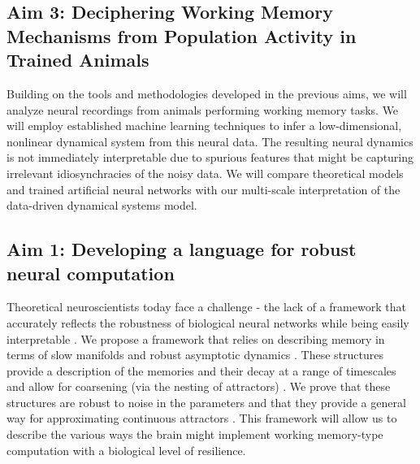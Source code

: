 \documentclass[12pt,letterpaper, onecolumn]{article}
\theoremstyle{definition}
\theoremstyle{remark}
\begin{document}
\subsection*{Aim 3: Deciphering Working Memory Mechanisms from Population Activity in Trained Animals}
Building on the tools and methodologies developed in the previous aims, we will analyze neural recordings from animals performing working memory tasks.
We will employ established machine learning techniques to infer a low-dimensional, nonlinear dynamical system from this neural data.
The resulting neural dynamics is not immediately interpretable due to spurious features that might be capturing irrelevant idiosynchracies of the noisy data.
We will compare theoretical models and trained artificial neural networks with our multi-scale interpretation of the data-driven dynamical systems model.

\newpage

\subsection*{Aim 1: Developing a language for robust neural computation}
Theoretical neuroscientists today face a challenge - the lack of a  framework that accurately reflects the robustness of biological neural networks while being easily interpretable \citep{lillicrap2019}.
We propose a framework that relies on describing memory in terms of slow manifolds \citep{ghazizadeh2021slow} and robust asymptotic dynamics \citep{casey1996}.
These structures provide a description of the memories and their decay at a range of timescales \citep{jaeger2023timescales} and allow for coarsening (via the nesting of attractors) \citep{braun2010}.
We prove that these structures are robust to noise in the parameters \citep{Park2023a} and that they provide a general way for approximating continuous attractors \citep{inagaki2019}.
This framework will allow us to describe the various ways the brain might implement working memory-type computation with a biological level of resilience.
\end{document}
